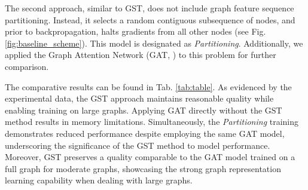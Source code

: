 \documentclass{article}
\begin{document}
The second approach, similar to GST, does not include graph feature sequence partitioning. Instead, it selects a random contiguous subsequence of nodes, and prior to backpropagation, halts gradients from all other nodes (see Fig. \ref{fig:baseline_scheme}). This model is designated as \textit{Partitioning}. Additionally, we applied the Graph Attention Network (GAT, \cite{velivckovic2017graph}) to this problem for further comparison.

The comparative results can be found in Tab. \ref{tab:table}. As evidenced by the experimental data, the GST approach maintains reasonable quality while enabling training on large graphs. Applying GAT directly without the GST method results in memory limitations. Simultaneously, the \textit{Partitioning} training demonstrates reduced performance despite employing the same GAT model, underscoring the significance of the GST method to model performance. Moreover, GST preserves a quality comparable to the GAT model trained on a full graph for moderate graphs, showcasing the strong graph representation learning capability when dealing with large graphs.
\end{document}

